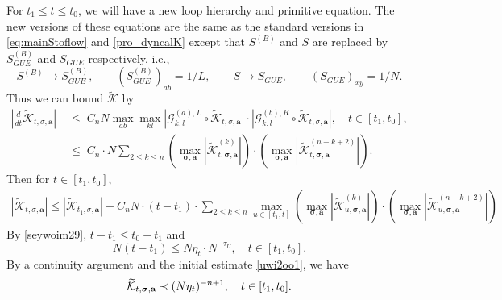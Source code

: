 \documentclass[10pt,reqno]{article}
\theoremstyle{plain} %
\theoremstyle{remark}
\numberwithin{equation}{section}
\begin{document}
 
For $  t_1\le t\le t_0$, we will have a new  loop hierarchy and primitive equation. The new versions of these equations are the same as the standard versions in  \eqref{eq:mainStoflow} and \eqref{pro_dyncalK} except that  $S^{(B)}$ and $S$ are replaced by $S^{(B)}_{GUE}$ and $S_{GUE}$ respectively, i.e., 
$$
S^{(B)}\to S^{(B)}_{GUE},\quad \quad \left(S^{(B)}_{GUE}\right)_{ab}=1/L,\quad  \quad S \to S _{GUE},\quad \quad \left(S _{GUE}\right)_{xy}=1/N.
$$ 
Thus we can bound  $\mathcal{\widetilde{K}}$ by 
\begin{align}
\left|\frac{d}{d t} \mathcal{\widetilde{K}}_{t, \sigma, \textbf{a}}\right|&\;\le\;  C_nN\max_{ab}\max_{kl}   \left|\mathcal{G}_{k, l}^{(a), L} \circ \mathcal{\widetilde{K}}_{t, \sigma, \textbf{a}}\right|\cdot   \left|\mathcal{G}_{k, l}^{(b), R} \circ \mathcal{\widetilde{K}}_{t, \sigma, \textbf{a}}\right|,\quad t\in [t_1,t_0], 
\\ &
\;\le\; C_n\cdot   N \sum_{2\le k\le n}\left(\max_{\boldsymbol{\sigma}, \textbf{a}}
\left|\mathcal{\widetilde{K}}^{(k)}_{t, \boldsymbol{\sigma}, \textbf{a}}\right|\right)\cdot \left(\max_{\boldsymbol{\sigma}, \textbf{a}}
\left|\mathcal{\widetilde{K}}^{(n-k+2)}_{t, \boldsymbol{\sigma}, \textbf{a}}\right|\right). 
\end{align}
Then for $t\in [t_1,t_0]$, 
\begin{align}
|\mathcal{\widetilde{K}}_{t, \sigma, \textbf{a}}|
\le |\mathcal{\widetilde{K}}_{t_1, \sigma, \textbf{a}}|+C_n N\cdot(t -t_1)
\cdot \sum_{2\le k\le n}\max_{u\in [t_1,t]}\left(\max_{\boldsymbol{\sigma}, \textbf{a}}
\left|\mathcal{\widetilde{K}}^{(k)}_{u, \boldsymbol{\sigma}, \textbf{a}}\right|\right)\cdot \left(\max_{\boldsymbol{\sigma}, \textbf{a}}
\left|\mathcal{\widetilde{K}}^{(n-k+2)}_{u, \boldsymbol{\sigma}, \textbf{a}}\right|\right)
\end{align}
By \eqref{seywoim29},  $t-t_1\le t_0-t_1$ and  
$$
N(t-t_1) \le  N\eta_{t }\cdot N^{-\tau_U} , \quad t\in [t_1,t_0].
$$  
By a continuity argument and the initial estimate  \eqref{uwi2oo1}, we have 
\begin{equation}\label{45} 
 {\cal \widetilde{K}}_{t , \boldsymbol{\sigma}, \textbf{a}}  \prec (N\eta_{t })^{-n+1}, \quad t\in [t_1,t_0]. 
\end{equation}
  
\end{document}
